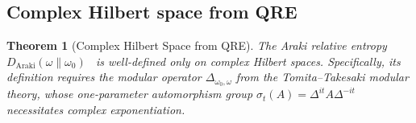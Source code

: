 \documentclass[letterpaper,twocolumn,superscriptaddress,longbibliography]{revtex4-2}
\newtheorem{theorem}{Theorem}[section]
\newcommand{\Daraki}{D_{\mathrm{Araki}}}
\begin{document}
\subsection{Complex Hilbert space from QRE}
\label{sec:complex}

\begin{theorem}[Complex Hilbert Space from QRE]
\label{thm:complex}
The Araki relative entropy
$\Daraki(\omega\|\omega_0)$~\cite{Araki1976}
is well-defined only on complex Hilbert spaces.
Specifically, its definition requires the modular
operator $\Delta_{\omega_0,\omega}$ from the
Tomita--Takesaki modular theory, whose one-parameter
automorphism group $\sigma_t(A) = \Delta^{it} A \Delta^{-it}$
necessitates complex exponentiation.
\end{theorem}
\end{document}
